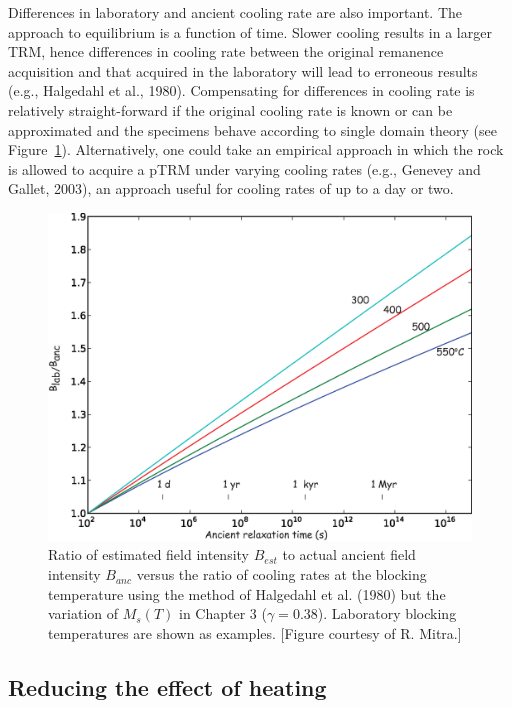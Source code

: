  
 Differences in laboratory and ancient cooling rate are also important. The approach to equilibrium is a function of time. Slower cooling results in a larger TRM, hence differences in 
 cooling rate between the original remanence acquisition and that acquired in the laboratory will
 lead to erroneous results (e.g., 
 Halgedahl et al., 1980).   \nocite{halgedahl80}   Compensating for differences in cooling rate is relatively straight-forward if the  original cooling rate is  known  or can be approximated and the specimens behave according to single domain theory (see Figure~\ref{fig:coolingrate}).  Alternatively, one could take an empirical approach in which the rock is allowed to acquire a pTRM under varying cooling rates (e.g., 
 Genevey and Gallet, 2003),       \nocite{genevey03}
  an approach useful for cooling rates of up to a day or two.  
 
\begin{figure}[htb]
\centering  \includegraphics[width= 10 cm]{EPSfiles/coolingrate.eps}
\caption{Ratio of estimated field intensity $B_{est}$ to actual ancient field intensity $B_{anc}$ versus the ratio of cooling rates at the blocking temperature using the method of Halgedahl et al. (1980) but the variation of $M_s(T)$ in Chapter 3 ($\gamma=0.38$).  Laboratory blocking temperatures are shown as examples. [Figure courtesy of R. Mitra.] }
\label{fig:coolingrate}
\end{figure} \nocite{selkin00b}

\subsection{Reducing the effect of heating}

